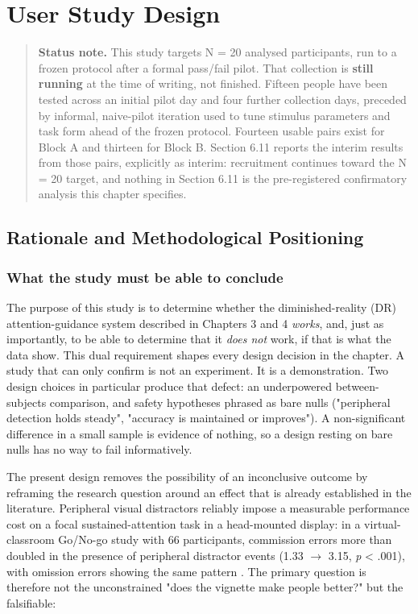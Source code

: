 \chapter{User Study Design}

\begin{quote}
\textbf{Status note.} This study targets N = 20 analysed participants, run to a frozen protocol after a
formal pass/fail pilot. That collection is \textbf{still running} at the time of writing, not finished.
Fifteen people have been tested across an initial pilot day and four further collection days,
preceded by informal, naive-pilot iteration used to tune stimulus parameters and task form ahead of
the frozen protocol. Fourteen usable pairs exist for Block A and thirteen for Block B. Section 6.11
reports the interim results from those pairs, explicitly as interim: recruitment continues toward the
N = 20 target, and nothing in Section 6.11 is the pre-registered confirmatory analysis this chapter
specifies.
\end{quote}

\section{Rationale and Methodological Positioning}

\subsection{What the study must be able to conclude}

The purpose of this study is to determine whether the diminished-reality (DR) attention-guidance
system described in Chapters 3 and 4 \textit{works}, and, just as importantly, to be able to determine that
it \textit{does not} work, if that is what the data show. This dual requirement shapes every design decision
in the chapter. A study that can only confirm is not an experiment. It is a demonstration. Two design
choices in particular produce that defect: an underpowered between-subjects comparison, and safety
hypotheses phrased as bare nulls ("peripheral detection holds steady", "accuracy is maintained or
improves"). A non-significant difference in a small sample is evidence of nothing, so a design
resting on bare nulls has no way to fail informatively.

The present design removes the possibility of an inconclusive outcome by reframing the research
question around an effect that is already established in the literature. Peripheral visual
distractors reliably impose a measurable performance cost on a focal sustained-attention task in a
head-mounted display: in a virtual-classroom Go/No-go study with 66 participants, commission errors
more than doubled in the presence of peripheral distractor events (1.33 $\rightarrow$ 3.15, \textit{p} < .001), with
omission errors showing the same pattern \citep{ai2025}. The primary question is therefore not the unconstrained "does the
vignette make people better?" but the falsifiable:

